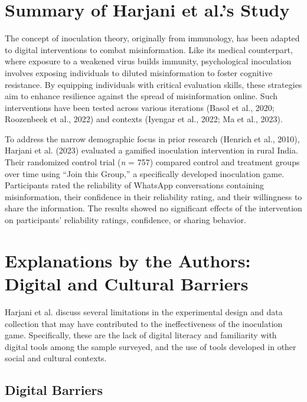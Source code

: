 \documentclass[authordate, reflection, issue]{jote-new-article}
\begin{document}
	\section{Summary of Harjani et al.'s Study}



	The concept of inoculation theory, originally from immunology, has been adapted to digital interventions to combat misinformation. Like its medical counterpart, where exposure to a weakened virus builds immunity, psychological inoculation involves exposing individuals to diluted misinformation to foster cognitive resistance. By equipping individuals with critical evaluation skills, these strategies aim to enhance resilience against the spread of misinformation online. Such interventions have been tested across various iterations (Basol et al., 2020; Roozenbeek et al., 2022) and contexts (Iyengar et al., 2022; Ma et al., 2023).



	To address the narrow demographic focus in prior research (Henrich et al., 2010), Harjani et al. (2023) evaluated a gamified inoculation intervention in rural India. Their randomized control trial (\emph{n} = 757) compared control and treatment groups over time using “Join this Group,” a specifically developed inoculation game. Participants rated the reliability of WhatsApp conversations containing misinformation, their confidence in their reliability rating, and their willingness to share the information. The results showed no significant effects of the intervention on participants' reliability ratings, confidence, or sharing behavior.



	\section{Explanations by the Authors: Digital and Cultural Barriers}



	Harjani et al. discuss several limitations in the experimental design and data collection that may have contributed to the ineffectiveness of the inoculation game. Specifically, these are the lack of digital literacy and familiarity with digital tools among the sample surveyed, and the use of tools developed in other social and cultural contexts.



	\subsection{Digital Barriers}
\end{document}

